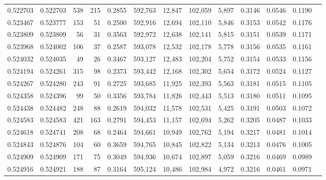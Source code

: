 \begin{tabular}{rrrrrrrrrrrrr}
0.522703 & 0.522703 &   538 &   215 &                                     0.2855 & 592,763 &  12,847 & 102,059 &   5,897 & 0.3146 & 0.0546 & 0.1190 \\
0.523467 & 0.523777 &   153 &    51 &                                     0.2500 & 592,916 &  12,694 & 102,110 &   5,846 & 0.3153 & 0.0542 & 0.1176 \\
0.523809 & 0.523809 &    56 &    31 &                                     0.3563 & 592,972 &  12,638 & 102,141 &   5,815 & 0.3151 & 0.0539 & 0.1171 \\
0.523968 & 0.524002 &   106 &    37 &                                     0.2587 & 593,078 &  12,532 & 102,178 &   5,778 & 0.3156 & 0.0535 & 0.1161 \\
0.524032 & 0.524035 &    49 &    26 &                                     0.3467 & 593,127 &  12,483 & 102,204 &   5,752 & 0.3154 & 0.0533 & 0.1156 \\
0.524194 & 0.524261 &   315 &    98 &                                     0.2373 & 593,442 &  12,168 & 102,302 &   5,654 & 0.3172 & 0.0524 & 0.1127 \\
0.524267 & 0.524280 &   243 &    91 &                                     0.2725 & 593,685 &  11,925 & 102,393 &   5,563 & 0.3181 & 0.0515 & 0.1105 \\
0.524358 & 0.524396 &    99 &    50 &                                     0.3356 & 593,784 &  11,826 & 102,443 &   5,513 & 0.3180 & 0.0511 & 0.1095 \\
0.524438 & 0.524482 &   248 &    88 &                                     0.2619 & 594,032 &  11,578 & 102,531 &   5,425 & 0.3191 & 0.0503 & 0.1072 \\
0.524583 & 0.524583 &   421 &   163 &                                     0.2791 & 594,453 &  11,157 & 102,694 &   5,262 & 0.3205 & 0.0487 & 0.1033 \\
0.524618 & 0.524741 &   208 &    68 &                                     0.2464 & 594,661 &  10,949 & 102,762 &   5,194 & 0.3217 & 0.0481 & 0.1014 \\
0.524843 & 0.524876 &   104 &    60 &                                     0.3659 & 594,765 &  10,845 & 102,822 &   5,134 & 0.3213 & 0.0476 & 0.1005 \\
0.524909 & 0.524909 &   171 &    75 &                                     0.3049 & 594,936 &  10,674 & 102,897 &   5,059 & 0.3216 & 0.0469 & 0.0989 \\
0.524916 & 0.524921 &   188 &    87 &                                     0.3164 & 595,124 &  10,486 & 102,984 &   4,972 & 0.3216 & 0.0461 & 0.0971 \\

\end{tabular}
